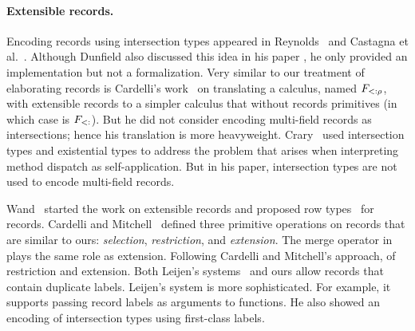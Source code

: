 \paragraph{Extensible records.}



Encoding records using intersection types appeared in
Reynolds~\cite{reynolds1997design} and Castagna et al.~\cite{castagna1995calculus}. 
Although Dunfield also discussed this idea in his paper \cite{dunfield2014elaborating}, 
he only provided an implementation but not a formalization. 
Very similar to our treatment of elaborating records is
Cardelli's work~\cite{cardelli1992extensible} on translating a calculus, named
$ F_{<: \rho}$, with extensible records to a simpler calculus that without
records primitives (in which case is $ F_{<:} $). 
But he did not consider encoding multi-field records as intersections; hence his translation is more
heavyweight. 
Crary~\cite{crary1998simple} used intersection types and
existential types to address the problem that arises when interpreting method
dispatch as self-application. 
But in his paper, intersection types are not used to encode multi-field records.

Wand~\cite{wand1987complete} started the work on extensible records and proposed
row types~\cite{wand1989type} for records. 
Cardelli and Mitchell~\cite{cardelli1990operations} defined three primitive operations on
records that are similar to ours: \emph{selection}, \emph{restriction}, and
\emph{extension}. 
The merge operator in \name plays the same role as extension.
Following Cardelli and Mitchell's approach, of restriction and extension. 
Both Leijen's systems~\cite{leijen2004first,leijen2005extensible} and ours allow records that contain
duplicate labels. 
Leijen's system is more sophisticated. 
For example, it supports passing record labels as arguments to functions. 
He also showed an encoding of intersection types using first-class labels.


%
%
%
%
%
%

